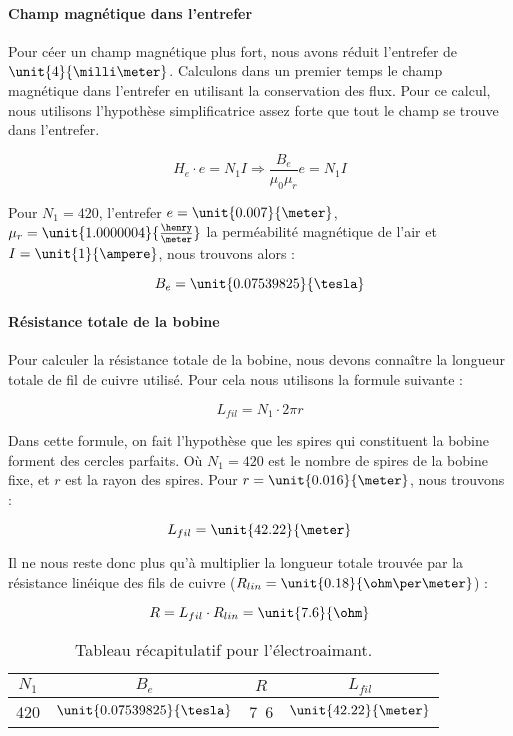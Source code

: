 \paragraph{Champ magnétique dans l'entrefer}
Pour céer un champ magnétique plus fort, nous avons réduit l'entrefer de $\unit{4}{\milli\meter}$.
Calculons dans un premier temps le champ magnétique dans l'entrefer en 
utilisant la conservation des flux. Pour ce calcul, nous utilisons l'hypothèse simplificatrice
assez forte que tout le champ se trouve dans l'entrefer.

$$H_e \cdot e = N_1 I \Rightarrow \frac{B_e}{\mu_0 \mu_r} e = N_1 I$$

Pour $N_1 = 420$, l'entrefer $e = \unit{0.007}{\meter}$, $\mu_r = \unit{1.0000004}{\frac{\henry}{\meter}}$ la perméabilité magnétique
de l'air et $I = \unit{1}{\ampere}$, nous trouvons alors :

$$B_e = \unit{0.07539825}{\tesla}$$

\paragraph{Résistance totale de la bobine}
Pour calculer la résistance totale de la bobine, nous devons connaître la longueur totale de fil de cuivre utilisé.
Pour cela nous utilisons la formule suivante :

$$L_{fil} = N_1 \cdot 2\pi r$$  

Dans cette formule, on fait l'hypothèse que les spires qui constituent la bobine forment des cercles
parfaits.
Où $N_1 = 420$ est le nombre de spires de la bobine fixe, et $r$ est la rayon des spires. Pour
$r = \unit{0.016}{\meter}$, nous trouvons :

$$L_{fil} = \unit{42.22}{\meter}$$

Il ne nous reste donc plus qu'à multiplier la longueur totale trouvée par la résistance linéique des fils de cuivre
($R_{lin} = \unit{0.18}{\ohm\per\meter}$) :

$$R = L_{fil} \cdot R_{lin} = \unit{7.6}{\ohm}$$

\begin{table}[!htb]
	\centering
	\begin{tabular}{c|c|c|c}
		$N_1$ & $B_e$ & $R$ & $L_{fil}$ \\
		\hline
		420 & $\unit{0.07539825}{\tesla}$ & \unit{7.6}{\ohm} &  $\unit{42.22}{\meter}$\\
	\end{tabular}
	\caption{Tableau récapitulatif pour l'électroaimant.}
\end{table}

